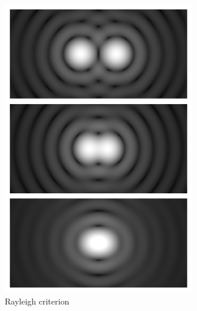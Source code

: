 \documentclass[10pt,a4paper]{book}
\begin{document}
\begin{figure}[ht]
    \centering
    \includegraphics[width=0.75\textwidth]{Airy_disk_spacing_near_Rayleigh_criterion.png}
    \caption{Rayleigh criterion}
    \label{fig:rayleigh}
\end{figure}
\end{document}
